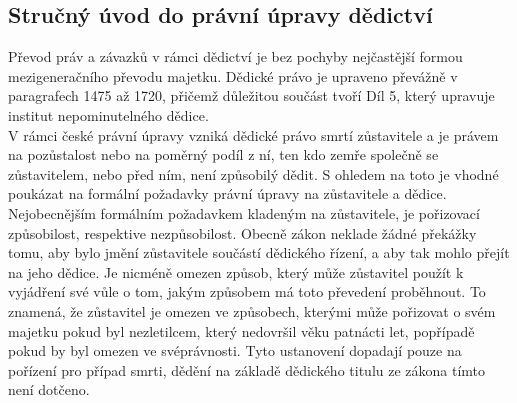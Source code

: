 \documentclass{article}
\begin{document}





\subsection{Stručný úvod do právní úpravy dědictví}

Převod práv a závazků v rámci dědictví je bez pochyby nejčastější formou mezigeneračního převodu majetku. Dědické právo je upraveno převážně v paragrafech 1475 až 1720, přičemž důležitou součást tvoří Díl 5, který upravuje institut nepominutelného dědice.\\

V rámci české právní úpravy vzniká dědické právo smrtí zůstavitele a je právem na pozůstalost nebo na poměrný podíl z ní, ten kdo zemře společně se zůstavitelem, nebo před ním, není způsobilý dědit. S ohledem na toto je vhodné poukázat na formální požadavky právní úpravy na zůstavitele a dědice. Nejobecnějším formálním požadavkem kladeným na zůstavitele, je pořizovací způsobilost, respektive nezpůsobilost. Obecně zákon neklade žádné překážky tomu, aby bylo jmění zůstavitele součástí dědického řízení, a aby tak mohlo přejít na jeho dědice. Je nicméně omezen způsob, který může zůstavitel použít k vyjádření své vůle o tom, jakým způsobem má toto převedení proběhnout. To znamená, že zůstavitel je omezen ve způsobech, kterými může pořizovat o svém majetku pokud byl nezletilcem, který nedovršil věku patnácti let, popřípadě pokud by byl omezen ve svéprávnosti. Tyto ustanovení dopadají pouze na pořízení pro případ smrti, dědění na základě dědického titulu ze zákona tímto není dotčeno. \\
\end{document}

